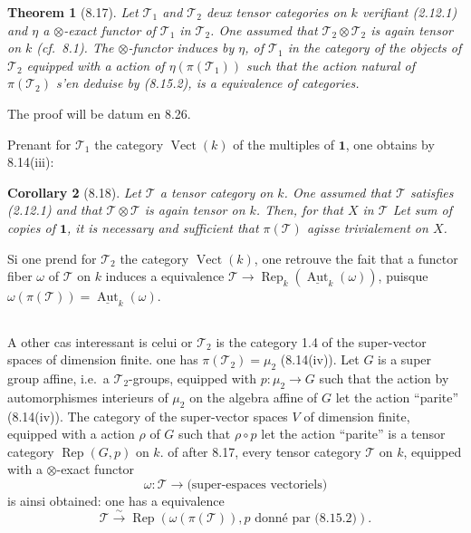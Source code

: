\documentclass[12pt,a4paper]{article}
\theoremstyle{plain}
\newtheorem{theorem}{Theorem}[section]
\newtheorem{corollary}[theorem]{Corollary}
\theoremstyle{definition}
\DeclareMathOperator{\Aut}{Aut}
\DeclareMathOperator{\Rep}{Rep}
\DeclareMathOperator{\Vect}{Vect}
\begin{document}
\begin{theorem}[8.17]
Let $\mathcal{T}_1$ and $\mathcal{T}_2$ deux tensor categories on $k$ verifiant (2.12.1) and $\eta$ a $\otimes$-exact functor of $\mathcal{T}_1$ in $\mathcal{T}_2$. One assumed that $\mathcal{T}_2 \otimes \mathcal{T}_2$ is again tensor on $k$ (cf.~8.1). The $\otimes$-functor induces by $\eta$, of $\mathcal{T}_1$ in the category of the objects of $\mathcal{T}_2$ equipped with a action of $\eta(\pi(\mathcal{T}_1))$ such that the action natural of $\pi(\mathcal{T}_2)$ s'en deduise by (8.15.2), is a equivalence of categories.
\end{theorem}

The proof will be datum en 8.26.

Prenant for $\mathcal{T}_1$ the category $\Vect(k)$ of the multiples of $\mathbf{1}$, one obtains by 8.14(iii):

\begin{corollary}[8.18]
Let $\mathcal{T}$ a tensor category on $k$. One assumed that $\mathcal{T}$ satisfies (2.12.1) and that $\mathcal{T} \otimes \mathcal{T}$ is again tensor on $k$. Then, for that $X$ in $\mathcal{T}$ Let sum of copies of $\mathbf{1}$, it is necessary and sufficient that $\pi(\mathcal{T})$ agisse trivialement on $X$.
\end{corollary}

Si one prend for $\mathcal{T}_2$ the category $\Vect(k)$, one retrouve the fait that a functor fiber $\omega$ of $\mathcal{T}$ on $k$ induces a equivalence $\mathcal{T} \to \Rep_k(\underline{\Aut}_k(\omega))$, puisque $\omega(\pi(\mathcal{T})) = \underline{\Aut}_k(\omega)$.

\subsection{}

A other cas interessant is celui or $\mathcal{T}_2$ is the category 1.4 of the super-vector spaces of dimension finite. one has $\pi(\mathcal{T}_2) = \mu_2$ (8.14(iv)). Let $G$ is a super group affine, i.e.~a $\mathcal{T}_2$-groups, equipped with $p : \mu_2 \to G$ such that the action by automorphismes interieurs of $\mu_2$ on the algebra affine of $G$ let the action ``parite'' (8.14(iv)). The category of the super-vector spaces $V$ of dimension finite, equipped with a action $\rho$ of $G$ such that $\rho \circ p$ let the action ``parite'' is a tensor category $\Rep(G, p)$ on $k$. of after 8.17, every tensor category $\mathcal{T}$ on $k$, equipped with a $\otimes$-exact functor
\[
\omega : \mathcal{T} \to \text{(super-espaces vectoriels)}
\]
is ainsi obtained: one has a equivalence
\[
\mathcal{T} \xrightarrow{\sim} \Rep(\omega(\pi(\mathcal{T})), p \text{ donné par (8.15.2)}).
\]
\end{document}
